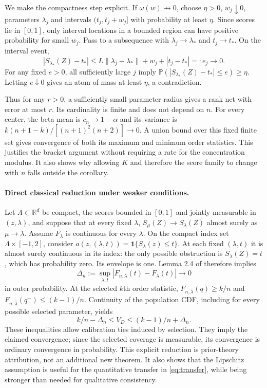 \documentclass{article}
\newcommand{\PP}{\mathbb P}
\newcommand{\ind}{\mathbf 1}
\newcommand{\R}{\mathbb R}
\begin{document}
We make the compactness step explicit. If $\omega(w)\not\to0$, choose $\eta>0$, $w_j\downarrow0$, parameters $\lambda_j$ and intervals $(t_j,t_j+w_j]$ with probability at least $\eta$. Since scores lie in $[0,1]$, only interval locations in a bounded region can have positive probability for small $w_j$. Pass to a subsequence with $\lambda_j\to\lambda_*$ and $t_j\to t_*$. On the interval event,
\begin{equation}
 |S_{\lambda_*}(Z)-t_*|\le L\|\lambda_j-\lambda_*\|+w_j+|t_j-t_*|=:e_j\to0.
\end{equation}
For any fixed $e>0$, all sufficiently large $j$ imply $\PP(|S_{\lambda_*}(Z)-t_*|\le e)\ge\eta$. Letting $e\downarrow0$ gives an atom of mass at least $\eta$, a contradiction.

Thus for any $r>0$, a sufficiently small parameter radius gives a rank net with error at most $r$. Its cardinality is finite and does not depend on $n$. For every center, the beta mean is $c_n\to1-\alpha$ and its variance is $k(n+1-k)/[(n+1)^2(n+2)]\to0$. A union bound over this fixed finite set gives convergence of both its maximum and minimum order statistics. This justifies the bracket argument without requiring a rate for the concentration modulus. It also shows why allowing $K$ and therefore the score family to change with $n$ falls outside the corollary.

\paragraph{Direct classical reduction under weaker conditions.}
Let $\Lambda\subset\R^d$ be compact, the scores bounded in $[0,1]$ and jointly measurable in $(z,\lambda)$, and suppose that at every fixed $\lambda$, $S_\mu(Z)\to S_\lambda(Z)$ almost surely as $\mu\to\lambda$. Assume $F_\lambda$ is continuous for every $\lambda$. On the compact index set $\Lambda\times[-1,2]$, consider $a(z,(\lambda,t))=\ind\{S_\lambda(z)\le t\}$. At each fixed $(\lambda,t)$ it is almost surely continuous in its index: the only possible obstruction is $S_\lambda(Z)=t$, which has probability zero. Its envelope is one. Lemma 2.4 of \citet{newey1994} therefore implies
\begin{equation}
 \Delta_n:=\sup_{\lambda,t}|F_{n,\lambda}(t)-F_\lambda(t)|\longrightarrow0
\end{equation}
in outer probability. At the selected $k$th order statistic, $F_{n,\hat\lambda}(q)\ge k/n$ and $F_{n,\hat\lambda}(q^-)\le(k-1)/n$. Continuity of the population CDF, including for every possible selected parameter, yields
\begin{equation}
 k/n-\Delta_n\le V_D\le(k-1)/n+\Delta_n.
\end{equation}
These inequalities allow calibration ties induced by selection. They imply the claimed convergence; since the selected coverage is measurable, its convergence is ordinary convergence in probability. This explicit reduction is prior-theory attribution, not an additional new theorem. It also shows that the Lipschitz assumption is useful for the quantitative transfer in \cref{eq:transfer}, while being stronger than needed for qualitative consistency.
\end{document}
